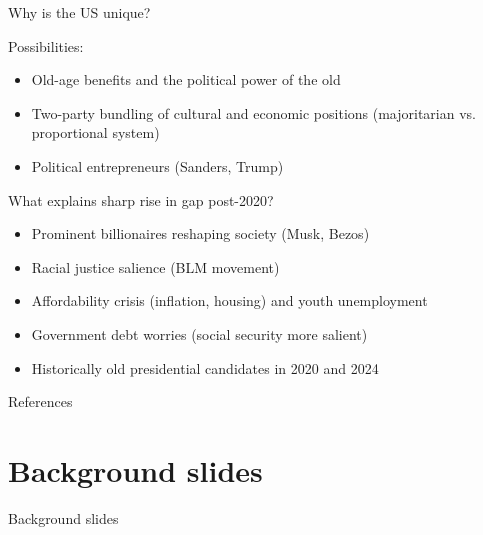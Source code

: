 \documentclass[aspectratio=169]{beamer}
\begin{document}
\begin{frame}{Why is the US unique?}

Possibilities:
\begin{itemize}
    \item Old-age benefits and the political power of the old
    \item Two-party bundling of cultural and economic positions (majoritarian vs. proportional system)
    \item Political entrepreneurs (Sanders, Trump)
\end{itemize}
What explains sharp rise in gap post-2020?
\begin{itemize}
    \item Prominent billionaires reshaping society (Musk, Bezos)
    \item Racial justice salience (BLM movement)
    \item Affordability crisis (inflation, housing) and youth unemployment
    \item Government debt worries (social security more salient)
    \item Historically old presidential candidates in 2020 and 2024
\end{itemize}

\end{frame}



\begin{frame}[allowframebreaks]{References}



\nocite{evs_wvs_joint}
\nocite{gss2024}
\nocite{anes_cumulative}


\end{frame}

\appendix
\section{Background slides}

\begin{frame}
\vfill
\centering
{\LARGE Background slides\par}
\vfill
\end{frame}
\end{document}
